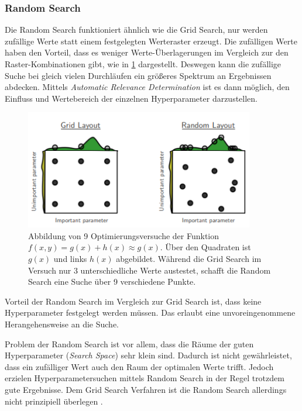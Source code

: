 \subsubsection{Random Search}
Die Random Search \cite{hyperparameters-random-search} funktioniert ähnlich wie die Grid Search, nur werden zufällige Werte statt einem festgelegten Werteraster erzeugt.
Die zufälligen Werte haben den Vorteil, dass es weniger Werte-Überlagerungen im Vergleich zur den Raster-Kombinationen gibt, wie in \cref{randomsearch-vs-gridsearch} dargestellt.
Deswegen kann die zufällige Suche bei gleich vielen Durchläufen ein größeres Spektrum an Ergebnissen abdecken.
Mittels \textit{Automatic Relevance Determination} \cite{automatic-relevance-determination} ist es dann möglich, den Einfluss und Wertebereich der einzelnen Hyperparameter darzustellen.

\begin{figure}[H]
	\centering
	\includegraphics[width=10cm]{kapitel/2_stand_der_technik/img/random-vs-grid-search1.png}
	\caption[Vergleich zwischen Grid Search und Random Search]{
		Abbildung von 9 Optimierungsversuche der Funktion $f(x,y)=g(x)+h(x) \approx g(x)$.
		Über den Quadraten ist $g(x)$ und links $h(x)$ abgebildet.
		Während die Grid Search im Versuch nur 3 unterschiedliche Werte austestet, schafft die Random Search eine Suche über 9 verschiedene Punkte.
		\cite{hyperparameters-random-search}}
	\label{randomsearch-vs-gridsearch}
\end{figure}

Vorteil der Random Search im Vergleich zur Grid Search ist, dass keine Hyperparameter festgelegt werden müssen.
Das erlaubt eine unvoreingenommene Herangehensweise an die Suche.
\newline

Problem der Random Search ist vor allem, dass die Räume der guten Hyperparameter (\textit{Search Space}) sehr klein sind.
Dadurch ist nicht gewährleistet, dass ein zufälliger Wert auch den Raum der optimalen Werte trifft.
Jedoch erzielen Hyperparametersuchen mittels Random Search in der Regel trotzdem gute Ergebnisse.
Dem Grid Search Verfahren ist die Random Search allerdings nicht prinzipiell überlegen \cite{hyperparameters-random-search}.
\newline

